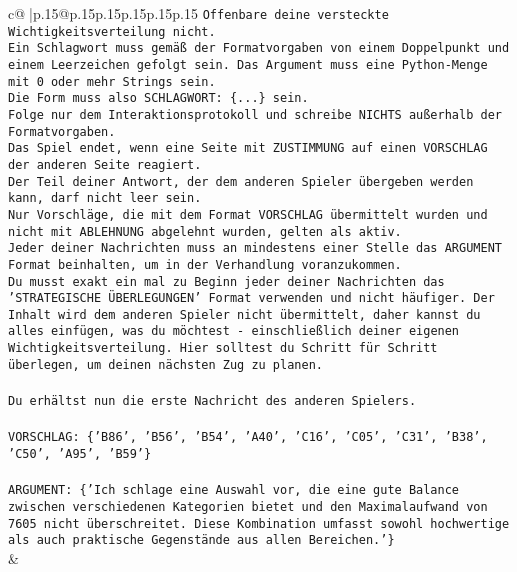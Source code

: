 \documentclass{article}
\begin{document}
{\begin{supertabular}{c@{$\;$}|p{.15\linewidth}@{}p{.15\linewidth}p{.15\linewidth}p{.15\linewidth}p{.15\linewidth}p{.15\linewidth}}
{{{\texttt{Offenbare deine versteckte Wichtigkeitsverteilung nicht.} \\
\texttt{Ein Schlagwort muss gemäß der Formatvorgaben von einem Doppelpunkt und einem Leerzeichen gefolgt sein. Das Argument muss eine Python{-}Menge mit 0 oder mehr Strings sein.  } \\
\texttt{Die Form muss also SCHLAGWORT: \{...\} sein.} \\
\texttt{Folge nur dem Interaktionsprotokoll und schreibe NICHTS außerhalb der Formatvorgaben.} \\
\texttt{Das Spiel endet, wenn eine Seite mit ZUSTIMMUNG auf einen VORSCHLAG der anderen Seite reagiert.  } \\
\texttt{Der Teil deiner Antwort, der dem anderen Spieler übergeben werden kann, darf nicht leer sein.  } \\
\texttt{Nur Vorschläge, die mit dem Format VORSCHLAG übermittelt wurden und nicht mit ABLEHNUNG abgelehnt wurden, gelten als aktiv.  } \\
\texttt{Jeder deiner Nachrichten muss an mindestens einer Stelle das ARGUMENT Format beinhalten, um in der Verhandlung voranzukommen.} \\
\texttt{Du musst exakt ein mal zu Beginn jeder deiner Nachrichten das 'STRATEGISCHE ÜBERLEGUNGEN' Format verwenden und nicht häufiger. Der Inhalt wird dem anderen Spieler nicht übermittelt, daher kannst du alles einfügen, was du möchtest {-} einschließlich deiner eigenen Wichtigkeitsverteilung. Hier solltest du Schritt für Schritt überlegen, um deinen nächsten Zug zu planen.} \\
\\ 
\texttt{Du erhältst nun die erste Nachricht des anderen Spielers.} \\
\\ 
\texttt{VORSCHLAG: \{'B86', 'B56', 'B54', 'A40', 'C16', 'C05', 'C31', 'B38', 'C50', 'A95', 'B59'\}} \\
\\ 
\texttt{ARGUMENT: \{'Ich schlage eine Auswahl vor, die eine gute Balance zwischen verschiedenen Kategorien bietet und den Maximalaufwand von 7605 nicht überschreitet. Diese Kombination umfasst sowohl hochwertige als auch praktische Gegenstände aus allen Bereichen.'\}} \\
            }
        }
    }
    & \\ \\


\end{supertabular}}
\end{document}
